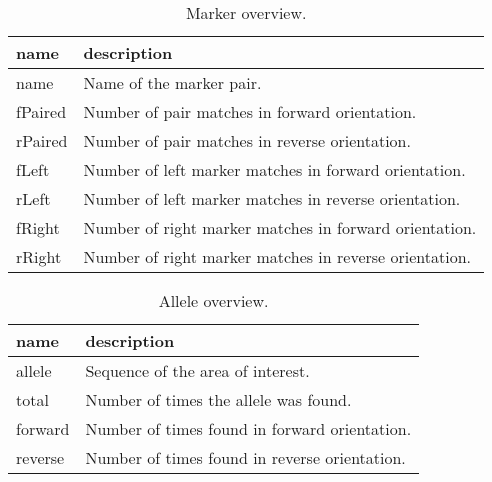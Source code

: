 \documentclass{article}
\begin{document}
\begin{table}[h]
  \caption{Marker overview.}
  \label{tab:marker}
  \begin{center}
    \begin{tabular}{l|l}
      name & description\\
      \hline
      name    & Name of the marker pair.\\
      fPaired & Number of pair matches in forward orientation.\\
      rPaired & Number of pair matches in reverse orientation.\\
      fLeft   & Number of left marker matches in forward orientation.\\
      rLeft   & Number of left marker matches in reverse orientation.\\
      fRight  & Number of right marker matches in forward orientation.\\
      rRight  & Number of right marker matches in reverse orientation.\\
    \end{tabular}
  \end{center}
\end{table}

\begin{table}[h]
  \caption{Allele overview.}
  \label{tab:allele}
  \begin{center}
    \begin{tabular}{l|l}
      name & description\\
      \hline
      allele  & Sequence of the area of interest.\\
      total   & Number of times the allele was found.\\
      forward & Number of times found in forward orientation.\\
      reverse & Number of times found in reverse orientation.\\
    \end{tabular}
  \end{center}
\end{table}
\end{document}
